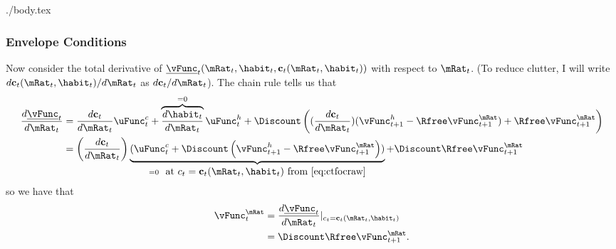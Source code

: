 \documentclass{handout}
\begin{document}
\begin{verbatimwrite}{./body.tex}
\subsubsection{Envelope Conditions}

Now consider the total derivative of $\underline{\vFunc}_{t}(\mRat_{t},\habit_{t},\mathbf{c}_{t}(\mRat_{t},\habit_{t}))$ with respect to $\mRat_{t}$.
(To reduce clutter, I will write $d \mathbf{c}_{t}(\mRat_{t},\habit_{t})/d \mRat_{t}$ as $d \mathbf{c}_{t}/d \mRat_{t}$).
The chain rule tells us that
\begin{equation}\begin{gathered}\begin{aligned}
        \frac{d \underline{\vFunc}_{t}}{d \mRat_{t}} & =  \frac{d \mathbf{c}_{t}}{d \mRat_{t}}\uFunc^{c}_{t}+\overbrace{\frac{d \habit_{t}}{d \mRat_{t}}}^{=0} \uFunc^{h}_{t}  
         + \Discount \left((\frac{d \mathbf{c}_{t}}{d \mRat_{t}})(\vFunc^{h}_{t+1}-\Rfree \vFunc_{t+1}^{\mRat}) + \Rfree \vFunc_{t+1}^{\mRat} \right)
\\ & =  \left(\frac{d \mathbf{c}_{t}}{d \mRat_{t}}\right)
\underbrace{(\uFunc_{t}^{c}+\Discount\left(\vFunc_{t+1}^{h}-\Rfree \vFunc_{t+1}^{\mRat}\right))}_{=0~\mbox{ at $c_{t}=\mathbf{c}_{t}(\mRat_{t},\habit_{t})$ from \eqref{eq:ctfocraw}}}+\Discount \Rfree \vFunc_{t+1}^{\mRat}
\end{aligned}\end{gathered}\end{equation}
so we have that 
\begin{equation}\begin{gathered}\begin{aligned}
        \vFunc_{t}^{\mRat} & =  \frac{d \underline{\vFunc}_{t}}{d \mRat_{t}}|_{c_{t}=\mathbf{c}_{t}(\mRat_{t},\habit_{t})}  \\
         & =  \Discount \Rfree \vFunc^{\mRat}_{t+1}.
\end{aligned}\end{gathered}\end{equation}


\end{verbatimwrite}
\end{document}

